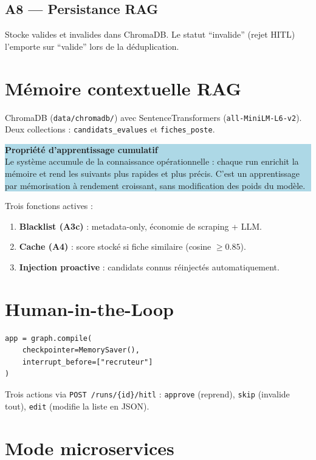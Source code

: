 \documentclass[12pt,a4paper]{report}
\begin{document}
\subsection{A8 --- Persistance RAG}
Stocke valides et invalides dans ChromaDB. Le statut ``invalide'' (rejet HITL)
l'emporte sur ``valide'' lors de la déduplication.

\section{Mémoire contextuelle RAG}

ChromaDB (\texttt{data/chromadb/}) avec SentenceTransformers
(\texttt{all-MiniLM-L6-v2}). Deux collections : \texttt{candidats\_evalues}
et \texttt{fiches\_poste}.

\medskip
\colorbox{lightblue}{\parbox{0.95\textwidth}{
\smallskip
\textbf{\color{primary}Propriété d'apprentissage cumulatif}\\
Le système accumule de la connaissance opérationnelle : chaque run enrichit
la mémoire et rend les suivants plus rapides et plus précis. C'est un
apprentissage par mémorisation à rendement croissant, sans modification des
poids du modèle.
\smallskip
}}
\medskip

Trois fonctions actives :
\begin{enumerate}
  \item \textbf{Blacklist (A3c)} : metadata-only, économie de scraping + LLM.
  \item \textbf{Cache (A4)} : score stocké si fiche similaire (cosine $\geq 0.85$).
  \item \textbf{Injection proactive} : candidats connus réinjectés automatiquement.
\end{enumerate}

\section{Human-in-the-Loop}

\begin{lstlisting}[caption={src/graph.py --- compilation avec HITL}]
app = graph.compile(
    checkpointer=MemorySaver(),
    interrupt_before=["recruteur"]
)
\end{lstlisting}

Trois actions via \texttt{POST /runs/\{id\}/hitl} :
\texttt{approve} (reprend), \texttt{skip} (invalide tout), \texttt{edit} (modifie
la liste en JSON).

\section{Mode microservices}
\end{document}
